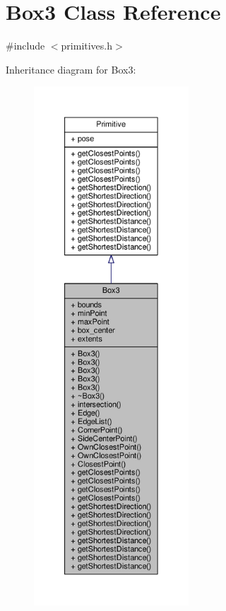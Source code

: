 \hypertarget{class_box3}{}\section{Box3 Class Reference}
\label{class_box3}


{\ttfamily \#include $<$primitives.\+h$>$}



Inheritance diagram for Box3\+:
\nopagebreak
\begin{figure}[H]
\begin{center}
\leavevmode
\includegraphics[height=550pt]{class_box3__inherit__graph}
\end{center}
\end{figure}


